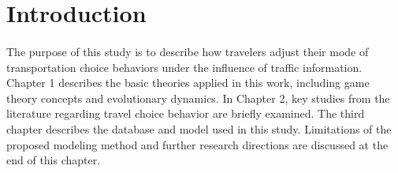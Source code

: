 
\thispagestyle{empty}
\section*{Introduction}

\paragraph{}The purpose of this study is to describe how travelers adjust their mode of transportation choice behaviors under the influence of traffic information. Chapter 1 describes the basic theories applied in this work, including game theory concepts and evolutionary dynamics. In Chapter 2, key studies from the literature regarding travel choice behavior are briefly examined. The third chapter describes the database and model used in this study. Limitations of the proposed modeling method and further research directions are discussed at the end of this chapter. 
